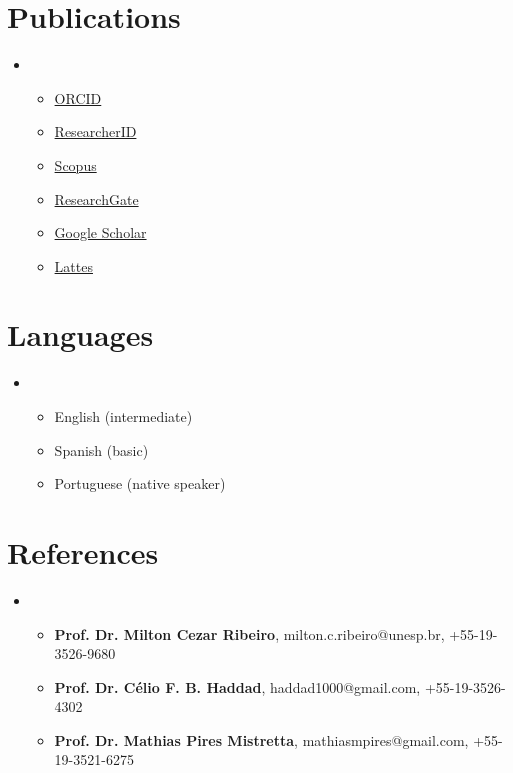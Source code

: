 \documentclass[letterpaper,11pt]{article}
\newcommand{\cvitem}[1]{
  \item\small{
    {#1\vspace{-2pt}}
  }
}
\newcommand{\cvheadingstart}{\begin{itemize}[leftmargin=0in, label={}]}
\newcommand{\cvheadingend}{\end{itemize}}
\newcommand{\cvitemstart}{\begin{itemize}\justifying}
\newcommand{\cvitemend}{\end{itemize}\vspace{-5pt}}
\begin{document}
\section{Publications}
\cvheadingstart
\item
\cvitemstart
  \cvitem{\href{https://orcid.org/0000-0001-9650-7575}{ORCID}}
  \cvitem{\href{https://www.webofscience.com/wos/author/record/837504}{ResearcherID}}
  \cvitem{\href{https://www.scopus.com/authid/detail.uri?authorId=57193451888}{Scopus}}
  \cvitem{\href{https://www.researchgate.net/profile/Mauricio-Vancine}{ResearchGate}}
  \cvitem{\href{https://scholar.google.com/citations?user=i-2xZBQAAAAJ}{Google Scholar}}
  \cvitem{\href{http://lattes.cnpq.br/9761288418931193}{Lattes}}
\cvitemend
\cvheadingend

\section{Languages}
\cvheadingstart
\item
\cvitemstart
  \cvitem{English (intermediate)}
  \cvitem{Spanish (basic)}
  \cvitem{Portuguese (native speaker)}
\cvitemend
\cvheadingend

\section{References}
\cvheadingstart
\item
\cvitemstart
  \cvitem{{\bf Prof. Dr. Milton Cezar Ribeiro}, milton.c.ribeiro@unesp.br, +55-19-3526-9680}
  \cvitem{{\bf Prof. Dr. Célio F. B. Haddad}, haddad1000@gmail.com, +55-19-3526-4302}
  \cvitem{{\bf Prof. Dr. Mathias Pires Mistretta},
  mathiasmpires@gmail.com, +55-19-3521-6275}
\cvitemend
\cvheadingend
\end{document}
